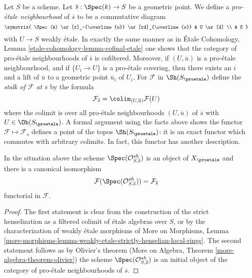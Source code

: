 \noindent
Let $S$ be a scheme. Let $\overline{s} : \Spec(k) \to S$ be a geometric
point. We define a {\it pro-\'etale neighbourhood} of $\overline{s}$
to be a commutative diagram
$$
\xymatrix{
\Spec(k) \ar[r]_-{\overline{u}} \ar[rd]_{\overline{s}} & U \ar[d] \\
& S
}
$$
with $U \to S$ weakly \'etale. In exactly the same manner as in
\'Etale Cohomology, Lemma \ref{etale-cohomology-lemma-cofinal-etale}
one shows that the category of pro-\'etale
neighbourhoods of $\overline{s}$ is cofiltered. Moreover, if
$(U, \overline{u})$ is a pro-\'etale neighbourhood, and if $\{U_i \to U\}$
is a pro-\'etale covering, then there exists an $i$ and a lift of
$\overline{u}$ to a geometric point $\overline{u}_i$ of $U_i$.
For $\mathcal{F}$ in $\Sh(S_\proetale)$ define the {\it stalk
of $\mathcal{F}$ at $\overline{s}$} by the formula
$$
\mathcal{F}_{\overline{s}} = \colim_{(U, \overline{u})} \mathcal{F}(U)
$$
where the colimit is over all pro-\'etale neighbourhoods $(U, \overline{u})$
of $\overline{s}$ with $U \in \Ob(S_\proetale)$.
A formal argument using the facts above shows the functor
$\mathcal{F} \mapsto \mathcal{F}_{\overline{s}}$
defines a point of the topos $\Sh(S_\proetale)$:
it is an exact functor which commutes with arbitrary colimits.
In fact, this functor has another description.

\begin{lemma}
\label{lemma-classical-point}
In the situation above the scheme $\Spec(\mathcal{O}_{S, \overline{s}}^{sh})$
is an object of $X_\proetale$ and there is a canonical isomorphism
$$
\mathcal{F}(\Spec(\mathcal{O}_{S, \overline{s}}^{sh})) =
\mathcal{F}_{\overline{s}}
$$
functorial in $\mathcal{F}$.
\end{lemma}

\begin{proof}
The first statement is clear from the construction of the strict henselization
as a filtered colimit of \'etale algebras over $S$, or by the characterization
of weakly \'etale morphisms of
More on Morphisms, Lemma
\ref{more-morphisms-lemma-weakly-etale-strictly-henselian-local-rings}.
The second statement follows as by Olivier's theorem
(More on Algebra, Theorem \ref{more-algebra-theorem-olivier})
the scheme $\Spec(\mathcal{O}_{S, \overline{s}}^{sh})$
is an initial object of the category of pro-\'etale neighbourhoods
of $\overline{s}$.
\end{proof}

